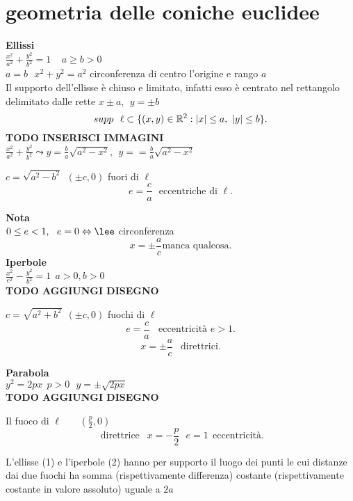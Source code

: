 \documentclass[12px]{article}
\begin{document}
\section{geometria delle coniche euclidee}
\textbf{Ellissi}\\
$\displaystyle \frac{x^2}{a^2} + \frac {y^2}{b^2}=1 \ \ \ \ \ a\geq b>0$\\
 $a = b \ \ \ x^2 + y^2 = a^2$ circonferenza di centro l'origine e rango $a$ \\
 Il  supporto dell'ellisse è chiuso e limitato, infatti esso è centrato nel rettangolo delimitato dalle rette $x\pm a, \ \ y=\pm b$
  \[
	  supp \ \ \ell \subset \{ (x,y)\in\mathbb{R}^2 : |x|\leq a , \ |y| \leq b\}
 .\] 
  \textbf{TODO INSERISCI IMMAGINI}\\
  $\displaystyle\frac {x^2}{a^2} + \frac{y^2}{b^2} \leadsto y=\frac b a \sqrt{a^2-x^2}, \ \ y = =\frac b a \sqrt{a^2-x^2}$ \\
  \begin{defi}
	  $c = \sqrt{a^2-b^2} \ \ (\pm c, 0) $ fuori di $\ell$
	   \[
		   e = \frac c a \ \ \ \text{eccentriche di }\ell
	  .\] 
  \end{defi}
  \textbf{Nota}\\
  $0 \leq e < 1, \ \ e = 0 \Leftrightarrow\lee$ circonferenza
  \[
	  x =\pm \frac a c  \text{manca qualcosa}
  .\] 
  \textbf{Iperbole}\\
  $\displaystyle\frac {x^2}{e^2} - \frac{y^2}{b^2} = 1 \ \ a > 0, b > 0$\\
  \textbf{TODO AGGIUNGI DISEGNO}\\
  \begin{defi}
	  $c = \sqrt{a^2 + b^2} \ \ (\pm c,0)$ fuochi di $\ell$ 
	   \[
		   e = \frac c a \ \ \ \ \text{eccentricità } e>1
	  .\] 
	  \[
		  x = \pm \frac a c \ \ \text{ direttrici}
	  .\] 
  \end{defi}
  \textbf{Parabola}\\
  $y^2 = 2 px \ \ p>0\ \ \ y = \pm\sqrt{2px}$\\
   \textbf{TODO AGGIUNGI DISEGNO}
\begin{defi}
	Il fuoco di $\ell$ \ \ \ $(\frac p 2 , 0)$
	 \[
		 \text{ direttrice } \ \ x = -\frac  p 2 \ \ \ e = 1 \ \ \text{eccentricità}
	.\] 
\end{defi}
\begin{prop}
	L'ellisse (1) e l'iperbole (2) hanno per supporto il luogo dei punti le cui distanze dai due fuochi ha somma (rispettivamente differenza) costante (rispettivamente costante in valore assoluto) uguale a $2a$
\end{prop}
\end{document}
